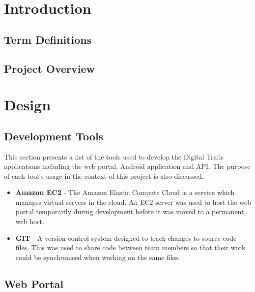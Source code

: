 \documentclass[11pt,a4paper]{report}
\begin{document}


\newpage
\setcounter{secnumdepth}{4}
\setcounter{page}{1}
\tableofcontents

\newpage
\setcounter{page}{1}
\chapter*{Introduction}
\newpage
\label{sec:introduction}
\section{Term Definitions}
\label{sec:term-definitions}
\section{Project Overview}
\label{sec:project-overview}

\chapter{Design}
\newpage
\label{sec:design}

\section{Development Tools}

This section presents a list of the tools used to develop the Digital Trails applications including the web portal, Android application and API. The purpose of each tool's usage in the context of this project is also discussed.

\begin{itemize}

\item \textbf{Amazon EC2} - The Amazon Elastic Compute Cloud is a service which manages virtual servers in the cloud. An EC2 server was used to host the web portal temporarily during development before it was moved to a permanent web host.

\item \textbf{GIT} - A version control system designed to track changes to source code files. This was used to share code between team members so that their work could be synchronised when working on the same files.

\end{itemize}

\section{Web Portal}
\label{sec:web-portal-design}
\end{document}
